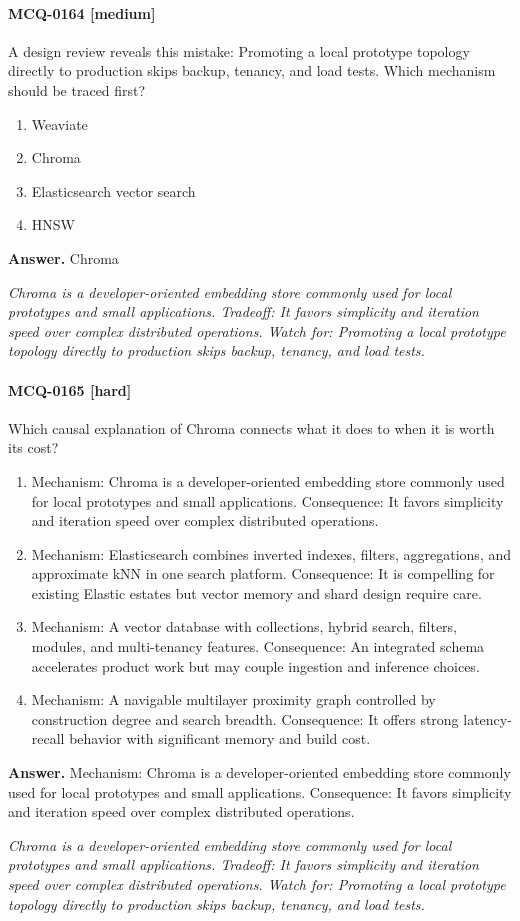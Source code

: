 \paragraph{MCQ-0164 [medium]} A design review reveals this mistake: Promoting a local prototype topology directly to production skips backup, tenancy, and load tests. Which mechanism should be traced first?
\begin{enumerate}[label=\Alph*.]
\item Weaviate
\item Chroma
\item Elasticsearch vector search
\item HNSW
\end{enumerate}
\noindent\textbf{Answer.} Chroma
\par\textit{Chroma is a developer-oriented embedding store commonly used for local prototypes and small applications. Tradeoff: It favors simplicity and iteration speed over complex distributed operations. Watch for: Promoting a local prototype topology directly to production skips backup, tenancy, and load tests.}
\paragraph{MCQ-0165 [hard]} Which causal explanation of Chroma connects what it does to when it is worth its cost?
\begin{enumerate}[label=\Alph*.]
\item Mechanism: Chroma is a developer-oriented embedding store commonly used for local prototypes and small applications. Consequence: It favors simplicity and iteration speed over complex distributed operations.
\item Mechanism: Elasticsearch combines inverted indexes, filters, aggregations, and approximate kNN in one search platform. Consequence: It is compelling for existing Elastic estates but vector memory and shard design require care.
\item Mechanism: A vector database with collections, hybrid search, filters, modules, and multi-tenancy features. Consequence: An integrated schema accelerates product work but may couple ingestion and inference choices.
\item Mechanism: A navigable multilayer proximity graph controlled by construction degree and search breadth. Consequence: It offers strong latency-recall behavior with significant memory and build cost.
\end{enumerate}
\noindent\textbf{Answer.} Mechanism: Chroma is a developer-oriented embedding store commonly used for local prototypes and small applications. Consequence: It favors simplicity and iteration speed over complex distributed operations.
\par\textit{Chroma is a developer-oriented embedding store commonly used for local prototypes and small applications. Tradeoff: It favors simplicity and iteration speed over complex distributed operations. Watch for: Promoting a local prototype topology directly to production skips backup, tenancy, and load tests.}
